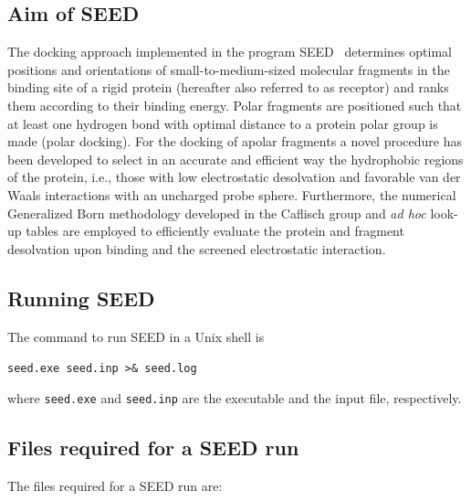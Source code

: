 \documentclass[a4paper,12pt,titlepage]{article}
\begin{document}
\subsection{Aim of SEED}

The docking approach implemented in the program SEED~\cite{Majeux:Exhaustive,Majeux:Efficient} 
determines optimal positions and orientations 
of small-to-medium-sized molecular fragments in the binding site of a rigid protein 
(hereafter also referred to as receptor) and ranks them 
according to their binding energy. Polar fragments are positioned such that 
at least one hydrogen bond with optimal distance to a protein polar group is made (polar docking). 
For the docking of apolar fragments a novel procedure has been developed to select 
in an accurate and efficient way the hydrophobic regions of 
the protein, i.e., those with low electrostatic desolvation and favorable 
van der Waals interactions with an uncharged probe sphere. 
Furthermore, the numerical Generalized Born methodology developed in the Caflisch group 
{\cite{Scarsi:Continuum,Scarsi:Comparison}} and {\it ad hoc} look-up tables are 
employed to efficiently evaluate the protein and fragment desolvation 
upon binding and the screened electrostatic interaction. 

\subsection{Running SEED}

The command to run SEED in a Unix shell is

{\tt seed.exe seed.inp >\& seed.log}

\noindent
where {\tt seed.exe} and {\tt seed.inp} are the executable and the input file, respectively.

\subsection{Files required for a SEED run}

The files required for a SEED run are:
\end{document}

